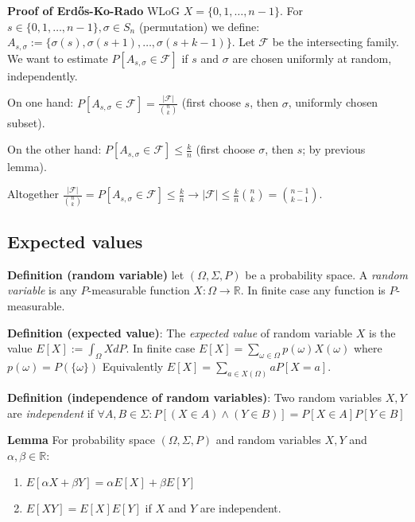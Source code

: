 \documentclass[a4paper]{article}
\begin{document}
\textbf{Proof of Erdős-Ko-Rado}
WLoG $X = \{0, 1, \ldots, n-1\}$. For $s \in \{0, 1, \ldots, n-1\}, \sigma \in S_n$ (permutation) we define:
$A_{s,\sigma} := \{\sigma(s), \sigma(s+1), \ldots, \sigma(s+k-1)\}$.
Let $\mathcal{F}$ be the intersecting family.
We want to estimate $P\left[A_{s,\sigma} \in \mathcal{F}\right]$ if $s$ and $\sigma$ are chosen uniformly at random, independently.

On one hand: $P\left[A_{s,\sigma} \in \mathcal{F}\right] = \frac{|\mathcal{F}|}{{n \choose k}}$ (first choose $s$, then $\sigma$, uniformly chosen subset).

On the other hand: $P\left[A_{s,\sigma} \in \mathcal{F}\right] \leq \frac{k}{n}$ (first choose $\sigma$, then $s$; by previous lemma).

Altogether $\frac{|\mathcal{F}|}{{n \choose k}} = P\left[A_{s,\sigma} \in \mathcal{F}\right] \leq \frac{k}{n} \rightarrow |\mathcal{F}| \leq \frac{k}{n}{{n \choose k}} = {n-1 \choose k-1}$.

\subsection*{Expected values}

\textbf{Definition (random variable)}
let $(\Omega, \Sigma, P)$ be a probability space.
A \emph{random variable} is any $P$-measurable function $X: \Omega \rightarrow \mathbb{R}$.
In finite case any function is $P$-measurable.

\textbf{Definition (expected value)}:
The \emph{expected value} of random variable $X$ is the value $E[X] := \int_\Omega X dP$.
In finite case $E[X] = \sum_{\omega \in \Omega} p(\omega) X(\omega)$ where $p(\omega) = P(\{\omega\})$
Equivalently $E[X] = \sum_{a \in X(\Omega)} aP[X = a]$.

\textbf{Definition (independence of random variables)}:
Two random variables $X, Y$ are \emph{independent} if $\forall A, B \in \Sigma : P[(X \in A) \land (Y \in B)] = P[X \in A] P[Y \in B]$ 

\textbf{Lemma}
For probability space $(\Omega, \Sigma, P)$ and random variables $X, Y$ and $\alpha, \beta \in \mathbb{R}$:
\begin{enumerate}[label=(\roman*)]
	\item $E[\alpha{}X + \beta{}Y] = \alpha{}E[X] + \beta{}E[Y]$
	\item $E[XY] = E[X] E[Y]$ if $X$ and $Y$ are independent.
\end{enumerate}
\end{document}
